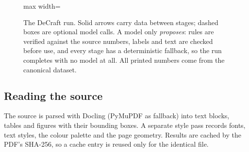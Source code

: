 \documentclass[10pt,twocolumn]{article}
\begin{document}
\begin{figure}[t]
\begin{adjustbox}{max width=\textwidth}
\end{adjustbox}
\caption{The DeCraft run. Solid arrows carry data between stages; dashed boxes are optional model
calls. A model only \emph{proposes}: rules are verified against the source numbers, labels and text
are checked before use, and every stage has a deterministic fallback, so the run completes with no
model at all. All printed numbers come from the canonical dataset.}
\label{fig:pipeline}
\end{figure}

\subsection{Reading the source}
The source is parsed with Docling (PyMuPDF as fallback) into text blocks, tables and figures with
their bounding boxes. A separate style pass records fonts, text styles, the colour palette and the
page geometry. Results are cached by the PDF's SHA-256, so a cache entry is reused only for the
identical file.
\end{document}

